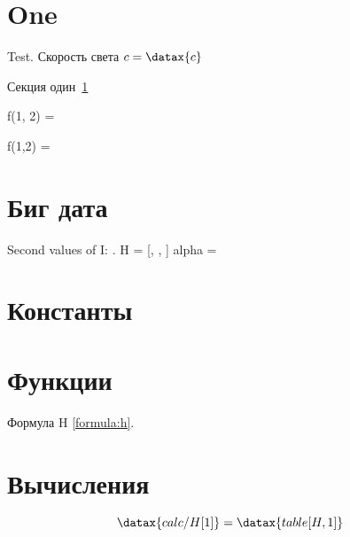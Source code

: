 \documentclass[
    oneside, %
    draft, %
    12pt %
]{article}
\begin{document}


\maketitleguapsimple

\section{One} \label{section:one}
Test.
Скорость света $c = \datax{c}$

Секция один~\ref{section:one}

f(1, 2) = 

\newcommand{\f}[1]{#1 = \datax{#1}}

\f{f(1,2)}

\section{Биг дата}



Second values of I: .
 H = [, ,  ]
 alpha = 

\section{Константы}


\section{Функции}


Формула H \eqref{formula:h}.

\section{Вычисления}

\[
\datax{calc/H[1]} = \datax{table[H,1]}
\]
\end{document}
